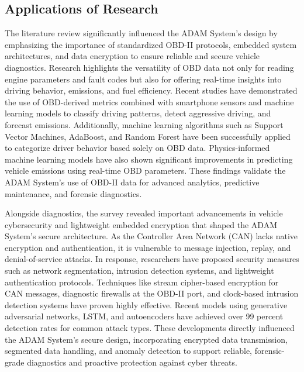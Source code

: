 \subsection{ Applications of Research}
The literature review significantly influenced the ADAM System’s design by emphasizing the importance of standardized OBD-II protocols, embedded system architectures, and data encryption to ensure reliable and secure vehicle diagnostics. Research highlights the versatility of OBD data not only for reading engine parameters and fault codes but also for offering real-time insights into driving behavior, emissions, and fuel efficiency. Recent studies have demonstrated the use of OBD-derived metrics combined with smartphone sensors and machine learning models to classify driving patterns, detect aggressive driving, and forecast emissions. Additionally, machine learning algorithms such as Support Vector Machines, AdaBoost, and Random Forest have been successfully applied to categorize driver behavior based solely on OBD data. Physics-informed machine learning models have also shown significant improvements in predicting vehicle emissions using real-time OBD parameters. These findings validate the ADAM System’s use of OBD-II data for advanced analytics, predictive maintenance, and forensic diagnostics.

Alongside diagnostics, the survey revealed important advancements in vehicle cybersecurity and lightweight embedded encryption that shaped the ADAM System’s secure architecture. As the Controller Area Network (CAN) lacks native encryption and authentication, it is vulnerable to message injection, replay, and denial-of-service attacks. In response, researchers have proposed security measures such as network segmentation, intrusion detection systems, and lightweight authentication protocols. Techniques like stream cipher-based encryption for CAN messages, diagnostic firewalls at the OBD-II port, and clock-based intrusion detection systems have proven highly effective. Recent models using generative adversarial networks, LSTM, and autoencoders have achieved over 99 percent detection rates for common attack types. These developments directly influenced the ADAM System’s secure design, incorporating encrypted data transmission, segmented data handling, and anomaly detection to support reliable, forensic-grade diagnostics and proactive protection against cyber threats.


